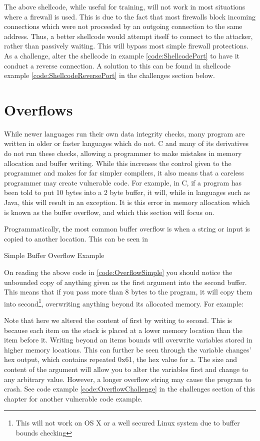 				The above shellcode, while useful for training, will not work in most situations where a firewall is used.
				This is due to the fact that most firewalls block incoming connections which were not proceeded by an outgoing connection to the same address.
				Thus, a better shellcode would attempt itself to connect to the attacker, rather than passively waiting.
				This will bypass most simple firewall protections.
				As a challenge, alter the shellcode in example \ref{code:ShellcodePort} to have it conduct a reverse connection.
				A solution to this can be found in shellcode example \ref{code:ShellcodeReversePort} in the challenges section below.

	\section{Overflows}
		While newer languages run their own data integrity checks, many program are written in older or faster languages which do not.
		C and many of its derivatives do not run these checks, allowing a programmer to make mistakes in memory allocation and buffer writing.
		While this increases the control given to the programmer and makes for far simpler compilers, it also means that a careless programmer may create vulnerable code.
		For example, in C, if a program has been told to put 10 bytes into a 2 byte buffer, it will, while in languages such as Java, this will result in an exception.
		It is this error in memory allocation which is known as the buffer overflow, and which this section will focus on.

		Programmatically, the most common buffer overflow is when a string or input is copied to another location. This can be seen in %
		\begin{code}
			\caption{Simple Buffer Overflow Example}
			\label{code:OverflowSimple}
		\end{code}
			On reading the above code in \ref{code:OverflowSimple} you should notice the unbounded copy of anything given as the first argument into the second buffer.
			This means that if you pass more than 8 bytes to the program, it will copy them into second\footnote{This will not work on OS X or a well secured Linux system due to buffer bounds checking}, overwriting anything beyond its allocated memory.
			For example:
			
			Note that here we altered the content of first by writing to second.
			This is because each item on the stack is placed at a lower memory location than the item before it.
			Writing beyond an items bounds will overwrite variables stored in higher memory locations.
			This can further be seen through the variable changes' hex output, which contains repeated 0x61, the hex value for a.
			The size and content of the argument will allow you to alter the variables first and change to any arbitrary value.
			However, a longer overflow string may cause the program to crash.
			See code example \ref{code:OverflowChallenge} in the challenges section of this chapter for another vulnerable code example.

